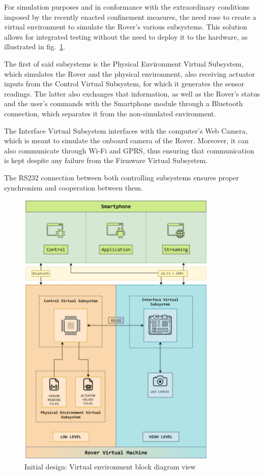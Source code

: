 For simulation purposes and in conformance with the extraordinary conditions imposed by the recently enacted confinement measures, the need rose to create a virtual environment to simulate the Rover's various subsystems. This solution allows for integrated testing without the need to deploy it to the hardware, as illustrated in fig.~\ref{fig:initial-design-2}.
\par
The first of said subsystems is the Physical Environment Virtual Subsystem, which simulates the Rover and the physical environment, also receiving actuator inputs from the Control Virtual Subsystem, for which it generates the sensor readings. The latter also exchanges that information, as well as the Rover's status and the user's commands with the Smartphone module through a Bluetooth connection, which separates it from the non-simulated environment.
\par
The Interface Virtual Subsystem interfaces with the computer's Web Camera, which is meant to simulate the onboard camera of the Rover. Moreover, it can also communicate through Wi-Fi and GPRS, thus ensuring that communication is kept despite any failure from the Firmware Virtual Subsystem. 
\par
The RS232 connection between both controlling subsystems ensures proper synchronism and cooperation between them.

\clearpage
\begin{figure}[!ht]
\centering
\includegraphics[width=0.85\textwidth]{./sec/img/initial_design_diagram_2.png}
\caption{\label{fig:initial-design-2}Initial design: Virtual environment block diagram view}
\end{figure}

